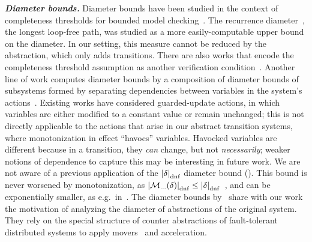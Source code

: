 \documentclass[acmsmall,screen]{acmart}
\newcommand{\para}[1]{\vspace{2pt}\noindent\textbf{\textit{#1.}}}
\newcommand{\card}[1]{{\left\vert{#1}\right\vert}} %
\newcommand{\tr}{\delta}
\newcommand{\dnfsize}[1]{\card{#1}_{\rm dnf}}
\newcommand{\monox}[2]{\mathcal{M}_{#2}({#1})}
\begin{document}
\para{Diameter bounds}
Diameter bounds have been studied in the context of completeness thresholds for bounded model checking~\cite{DBLP:conf/tacas/BiereCCZ99,DBLP:conf/vmcai/KroeningS03}.
The recurrence diameter~\cite{DBLP:conf/dac/BiereCCFZ99,DBLP:conf/vmcai/KroeningS03}, the longest loop-free path, was studied as a more easily-computable upper bound on the diameter. In our setting, this measure cannot be reduced by the abstraction, which only adds transitions.
There are also works that encode the completeness threshold assumption as another verification condition~\cite[see][\S IV.D]{DBLP:journals/tcad/DSilvaKW08}.
Another line of work computes diameter bounds by a composition of diameter bounds of subsystems formed by separating dependencies between variables in the system's actions~\cite{DBLP:journals/jar/AbdulazizNG18,DBLP:conf/cav/BaumgartnerKA02,DBLP:conf/ijcai/RintanenG13}. Existing works have considered guarded-update actions, in which variables are either modified to a constant value or remain unchanged; this is not directly applicable to the actions that arise in our abstract transition systems, where monotonization in effect ``havocs'' variables. Havocked variables are different because in a transition, they \emph{can} change, but not \emph{necessarily};
%
weaker notions of dependence to capture this may be interesting in future work.
%
We are not aware of a previous application of the $\dnfsize{\tr}$ diameter bound ().
This bound is never worsened by monotonization, as $\dnfsize{\monox{\tr}{\ldots}} \leq \dnfsize{\tr}$~\cite[][and a corollary of~]{DBLP:journals/iandc/Bshouty95}, and can be exponentially smaller, as e.g.\ in~.
The diameter bounds by~\citet{DBLP:conf/popl/KonnovLVW17,DBLP:conf/concur/KonnovVW14} share with our work the motivation of analyzing the diameter of abstractions of the original system. They rely on the special structure of counter abstractions of fault-tolerant distributed systems to apply movers~\cite{DBLP:journals/cacm/Lipton75} and acceleration.

%
%
%
%
%
%
%
%
\end{document}
